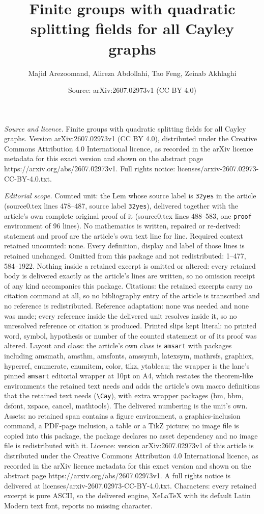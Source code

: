 \documentclass[10pt,a4paper]{amsart}
\title[Finite groups with quadratic splitting fields for all Cayley]{Finite groups with quadratic splitting fields for all Cayley graphs}
\author{Majid Arezoomand, Alireza Abdollahi, Tao Feng, Zeinab Akhlaghi}
\date{Source: arXiv:2607.02973v1 (CC BY 4.0)}
\begin{document}
\maketitle

\noindent\emph{Source and licence.} Finite groups with quadratic splitting fields for all Cayley graphs. Version arXiv:2607.02973v1 (CC BY 4.0), distributed under the Creative Commons Attribution 4.0 International licence, as recorded in the arXiv licence metadata for this exact version and shown on the abstract page https://arxiv.org/abs/2607.02973v1. Full rights notice: licenses/arxiv-2607.02973-CC-BY-4.0.txt.\par\smallskip

\noindent\textit{Editorial scope.} Counted unit: the Lem whose source label is \texttt{32yes} in the article (source0.tex lines 478--487, source label \texttt{32yes}), delivered together with the article's own complete original proof of it (source0.tex lines 488--583, one \texttt{proof} environment of 96 lines). No mathematics is written, repaired or re-derived: statement and proof are the article's own text line for line. Required context retained uncounted: none. Every definition, display and label of those lines is retained unchanged. Omitted from this package and not redistributed: 1--477, 584--1922. Nothing inside a retained excerpt is omitted or altered: every retained body is delivered exactly as the article's lines are written, so no omission receipt of any kind accompanies this package. Citations: the retained excerpts carry no citation command at all, so no bibliography entry of the article is transcribed and no reference is redistributed. Reference adaptation: none was needed and none was made; every reference inside the delivered unit resolves inside it, so no unresolved reference or citation is produced. Printed slips kept literal: no printed word, symbol, hypothesis or number of the counted statement or of its proof was altered. Layout and class: the article's own class is \texttt{amsart} with packages including amsmath, amsthm, amsfonts, amssymb, latexsym, mathrsfs, graphicx, hyperref, enumerate, enumitem, color, tikz, ytableau; the wrapper is the lane's pinned \texttt{amsart} editorial wrapper at 10pt on A4, which restates the theorem-like environments the retained text needs and adds the article's own macro definitions that the retained text needs (\texttt{\textbackslash Cay}), with extra wrapper packages (bm, bbm, dsfont, xspace, cancel, mathtools). The delivered numbering is the unit's own. Assets: no retained span contains a figure environment, a graphics-inclusion command, a PDF-page inclusion, a table or a TikZ picture; no image file is copied into this package, the package declares no asset dependency and no image file is redistributed with it. Licence: version arXiv:2607.02973v1 of this article is distributed under the Creative Commons Attribution 4.0 International licence, as recorded in the arXiv licence metadata for this exact version and shown on the abstract page https://arxiv.org/abs/2607.02973v1. A full rights notice is delivered at licenses/arxiv-2607.02973-CC-BY-4.0.txt. Characters: every retained excerpt is pure ASCII, so the delivered engine, XeLaTeX with its default Latin Modern text font, reports no missing character.
\end{document}
